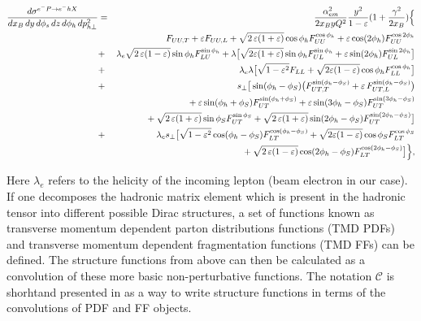 \begin{eqnarray}
\frac{d\sigma^{e^-P\to e^-hX}}{dx_B \, dy\, d\phi_s \,dz\, d\phi_h\, d p_{h\perp}^2}
&=&\frac{\alpha^2_{em}}{2x_B y Q^2}
\frac{y^2}{1-\varepsilon}  ( 1+\frac{\gamma^2}{2x_B} ) \Bigl\{  \nonumber \\
&& F_{UU ,T} +  \varepsilon F_{UU ,L}
+ \sqrt{2\,\varepsilon (1+\varepsilon)} \cos\phi_h F_{UU}^{\cos\phi_h}
+ \varepsilon \cos(2\phi_h) F_{UU}^{\cos 2\phi_h} \nonumber \\
&+& \lambda_e
\sqrt{2\,\varepsilon (1-\varepsilon)} \sin\phi_h F_{LU}^{\sin\phi_h}
+ \lambda \big[ \sqrt{2 \varepsilon (1+\varepsilon)} \sin\phi_h F_{UL}^{\sin\phi_h}
  +  \varepsilon \sin(2\phi_h) F_{UL}^{\sin 2\phi_h} \big] \nonumber \\
&+&  \lambda_e \lambda
\big[\sqrt{1-\varepsilon^2} F_{LL}
  +\sqrt{2\varepsilon (1-\varepsilon)} \cos\phi_h F_{LL}^{\cos \phi_h}\big] \nonumber \\
&+& s_\perp
\big[ \sin(\phi_h-\phi_S) \bigl(F_{UT ,T}^{\sin(\phi_h -\phi_S)}
  + \varepsilon\, F_{UT ,L}^{\sin(\phi_h -\phi_S)}\bigr) \nonumber \\
  && \phantom{s_\perp}
  + \varepsilon \sin(\phi_h+\phi_S) F_{UT}^{\sin(\phi_h +\phi_S)}
  + \varepsilon \sin(3\phi_h-\phi_S) F_{UT}^{\sin(3\phi_h -\phi_S)} \nonumber \\
  && \phantom{s_\perp}
  + \sqrt{2\,\varepsilon (1+\varepsilon)} \sin\phi_S F_{UT}^{\sin \phi_S }
  + \sqrt{2\,\varepsilon (1+\varepsilon)} \sin(2\phi_h-\phi_S) F_{UT}^{\sin(2\phi_h -\phi_S)}\big]\nonumber \\
&+& \lambda_e s_\perp
\big[\sqrt{1-\varepsilon^2} \cos(\phi_h-\phi_S) F_{LT}^{\cos(\phi_h -\phi_S)}
  +\sqrt{2\varepsilon (1-\varepsilon)} \cos\phi_S F_{LT}^{\cos \phi_S} \nonumber \\
  && \phantom{\lambda_e s_\perp}
  +\sqrt{2\,\varepsilon (1-\varepsilon)} \cos(2\phi_h-\phi_S) F_{LT}^{\cos(2\phi_h - \phi_S)} \big] \Bigr\},
\label{e:crossmaster}
\end{eqnarray}


Here $\lambda_e$ refers to the helicity of the incoming lepton (beam electron in our case).  If one decomposes the hadronic matrix element which is present in the hadronic tensor into different possible Dirac structures, a set of functions known as transverse momentum dependent parton distributions functions (TMD PDFs) and transverse momentum dependent fragmentation functions (TMD FFs) can be defined.  The structure functions from above can then be calculated as a convolution of these more basic non-perturbative functions.  The notation $\mathcal{C}$ is shorhtand  presented in \cite{tmds-bacchetta:2006} as a way to write structure functions in terms of the convolutions of PDF and FF objects.

